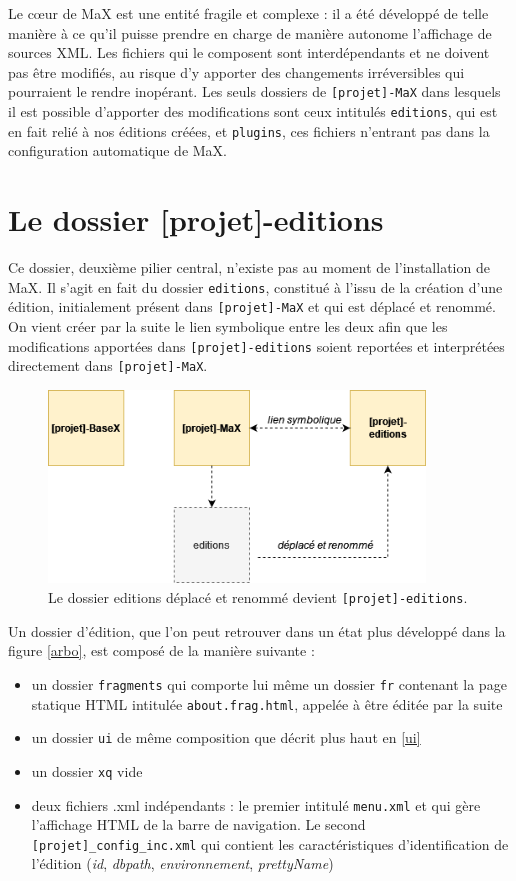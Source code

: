 \documentclass[a4paper,12pt,twoside]{book}
\begin{document}
Le c\oe{}ur de MaX est une entité fragile et complexe : il a été développé de telle manière à ce qu'il puisse prendre en charge de manière autonome l'affichage de sources XML. Les fichiers qui le composent sont interdépendants et ne doivent pas être modifiés, au risque d'y apporter des changements irréversibles qui pourraient le rendre inopérant. Les seuls dossiers de \texttt{[projet]-MaX} dans lesquels il est possible d'apporter des modifications sont ceux intitulés \texttt{editions}, qui est en fait relié à nos éditions créées, et  \texttt{plugins}, ces fichiers n'entrant pas dans la configuration automatique de MaX.

\section{Le dossier [projet]-editions}
Ce dossier, deuxième pilier central, n'existe pas au moment de l'installation de MaX. Il s'agit en fait du dossier \texttt{editions}, constitué à l'issu de la création d'une édition, initialement présent dans \texttt{[projet]-MaX} et qui est déplacé et renommé. On vient créer par la suite le lien symbolique entre les deux afin que les modifications apportées dans \texttt{[projet]-editions} soient reportées et interprétées directement dans \texttt{[projet]-MaX}.

\begin{figure}[H]
    \centering
    \includegraphics[width=10cm]{img/partie_2/editions.png}
    \caption{Le dossier editions déplacé et renommé devient \texttt{[projet]-editions}.}
\end{figure}

Un dossier d'édition, que l'on peut retrouver dans un état plus développé dans la figure \ref{arbo}, est composé de la manière suivante :
\begin{itemize}
    \item un dossier \texttt{fragments} qui comporte lui même un dossier \texttt{fr} contenant la page statique \acrshort{HTML} intitulée \texttt{about.frag.html}, appelée à être éditée par la suite
    \item un dossier \texttt{ui} de même composition que décrit plus haut en \ref{ui}
    \item un dossier \texttt{xq} vide
    \item deux fichiers .xml indépendants : le premier intitulé \texttt{menu.xml} et qui gère l'affichage \acrshort{HTML} de la barre de navigation. Le second   \texttt{[projet]\_config\_inc.xml} qui contient les caractéristiques d'identification de l'édition (\textit{id}, \textit{dbpath}, \textit{environnement}, \textit{prettyName})
\end{itemize}
\end{document}
